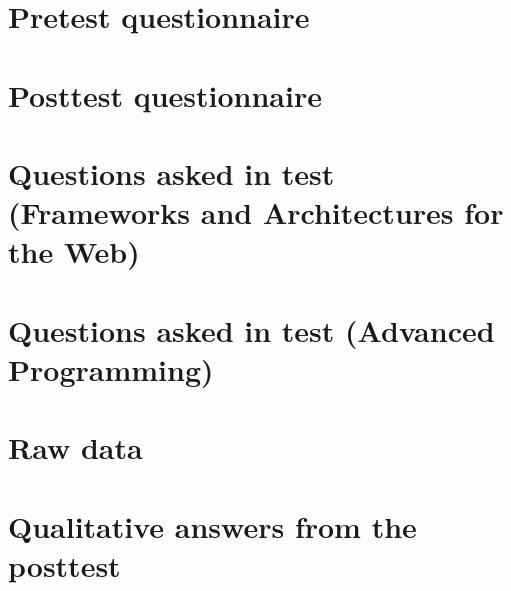\begin{appendices}

\section{Pretest questionnaire}\label{app:pretest}
 \clearpage


\section{Posttest questionnaire}\label{app:posttest}
 \clearpage


\section{Questions asked in test (Frameworks and Architectures for the Web)}\label{app:questions}
 \clearpage

\section{Questions asked in test (Advanced Programming)}\label{app:questions-advanced}
 \clearpage



\section{Raw data} \label{app:data}


\section{Qualitative answers from the posttest}\label{app:qualitative-answers-posttest}
 \clearpage


\end{appendices}